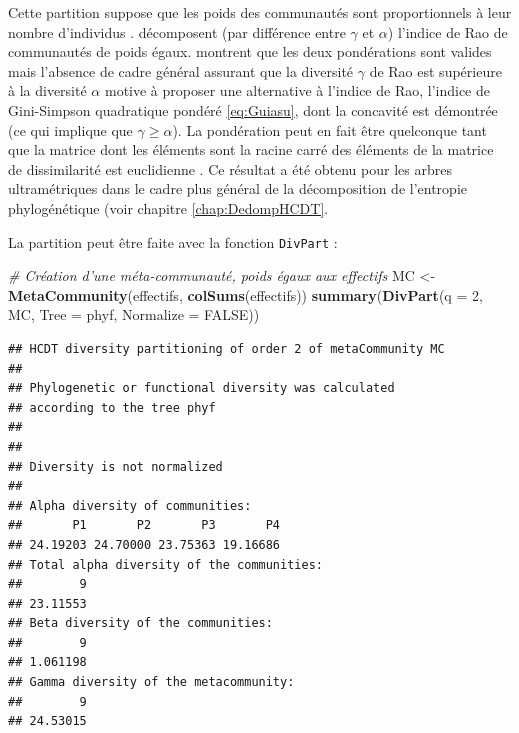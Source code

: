 \documentclass[
  11pt,
  french,
  a4paper,
  extrafontsizes,onecolumn,openright
  ]{memoir}
\newenvironment{Shaded}{\begin{snugshade}}{\end{snugshade}}
\newcommand{\CommentTok}[1]{\textcolor[rgb]{0.56,0.35,0.01}{\textit{#1}}}
\newcommand{\DataTypeTok}[1]{\textcolor[rgb]{0.13,0.29,0.53}{#1}}
\newcommand{\DecValTok}[1]{\textcolor[rgb]{0.00,0.00,0.81}{#1}}
\newcommand{\KeywordTok}[1]{\textcolor[rgb]{0.13,0.29,0.53}{\textbf{#1}}}
\newcommand{\NormalTok}[1]{#1}
\newcommand{\OtherTok}[1]{\textcolor[rgb]{0.56,0.35,0.01}{#1}}
\newcommand{\StringTok}[1]{\textcolor[rgb]{0.31,0.60,0.02}{#1}}
\begin{document}
Cette partition suppose que les poids des communautés sont proportionnels à leur nombre d'individus \autocite[Villeger2008]{Rao1982}.
\textcite{Hardy2007} décomposent (par différence entre \(\gamma\) et \(\alpha\)) l'indice de Rao de communautés de poids égaux.
\textcite{Hardy2008} montrent que les deux pondérations sont valides mais l'absence de cadre général assurant que la diversité \(\gamma\) de Rao est supérieure à la diversité \(\alpha\) \autocite{DeBello2010} motive \textcite{Guiasu2011} à proposer une alternative à l'indice de Rao, l'indice de Gini-Simpson quadratique pondéré \eqref{eq:Guiasu}, dont la concavité est démontrée (ce qui implique que \(\gamma\ge \alpha\)).
La pondération peut en fait être quelconque tant que la matrice dont les éléments sont la racine carré des éléments de la matrice de dissimilarité est euclidienne \autocite{Champely2002}.
Ce résultat a été obtenu pour les arbres ultramétriques dans le cadre plus général de la décomposition de l'entropie phylogénétique (voir chapitre \ref{chap:DedompHCDT}.

La partition peut être faite avec la fonction \texttt{DivPart} :

\scriptsize

\begin{Shaded}
\begin{Highlighting}[]
\CommentTok{# Création d'une méta-communauté, poids égaux aux effectifs}
\NormalTok{MC <-}\StringTok{ }\KeywordTok{MetaCommunity}\NormalTok{(effectifs, }\KeywordTok{colSums}\NormalTok{(effectifs))}
\KeywordTok{summary}\NormalTok{(}\KeywordTok{DivPart}\NormalTok{(}\DataTypeTok{q =} \DecValTok{2}\NormalTok{, MC, }\DataTypeTok{Tree =}\NormalTok{ phyf, }\DataTypeTok{Normalize =} \OtherTok{FALSE}\NormalTok{))}
\end{Highlighting}
\end{Shaded}

\begin{verbatim}
## HCDT diversity partitioning of order 2 of metaCommunity MC
## 
## Phylogenetic or functional diversity was calculated
## according to the tree phyf 
## 
## 
## Diversity is not normalized 
## 
## Alpha diversity of communities: 
##       P1       P2       P3       P4 
## 24.19203 24.70000 23.75363 19.16686 
## Total alpha diversity of the communities: 
##        9 
## 23.11553 
## Beta diversity of the communities: 
##        9 
## 1.061198 
## Gamma diversity of the metacommunity: 
##        9 
## 24.53015
\end{verbatim}

\normalsize
\end{document}
